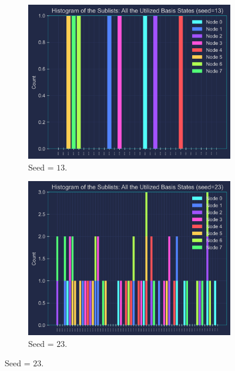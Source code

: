 \begin{figure}[hb!]
  \centering
  \begin{subfigure}[t]{0.495\textwidth}
      \centering
      \includegraphics[width=1\textwidth,height=0.75\textwidth]{Figures/Chapter_5/Random iQAQE (Coloured plots)/8-node(seed=13).png}
      \caption{Seed = $13$.}
      \label{fig:seed=13}
  \end{subfigure}
  \hfill
  \begin{subfigure}[t]{0.495\textwidth}
      \centering
      \includegraphics[width=1\textwidth,height=0.75\textwidth]{Figures/Chapter_5/Random iQAQE (Coloured plots)/8-node(seed=23).png}
      \caption{Seed = $23$.}
      \label{fig:seed=23}
  \end{subfigure}
\end{figure}

